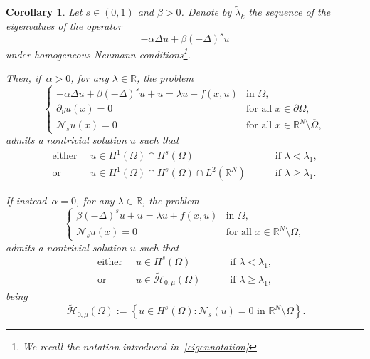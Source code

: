 \documentclass[12pt,a4paper,intlimits,sumlimits]{amsart}
\def \R {\mathbb{R}}
\def \Ns {\mathscr{N}_{s}}
\theoremstyle{definition}
\theoremstyle{plain}
\newtheorem{corollary}[definition]{Corollary}
\numberwithin{equation}{section}
\renewcommand{\ge}{\geqslant}
\begin{document}
\begin{corollary}\label{cor1}
Let $s\in (0, 1)$ and $\beta>0$.  Denote by $\widetilde\lambda_k$ the sequence of the eigenvalues of the operator
\[
-\alpha\Delta u + \beta (-\Delta)^s u
\]
under homogeneous Neumann conditions\footnote{We recall the notation introduced in~\eqref{eigennotation}}.

Then, if~$\alpha>0$, for any $\lambda\in\R$, the problem
\begin{equation}\label{P11}
\begin{cases}
-\alpha\Delta u + \beta (-\Delta)^s u +u=\lambda u +f(x,u)  &\mbox{in }\Omega,\\
\partial_\nu u(x)=0  &\mbox{for all } x\in \partial\Omega,\\
 \Ns u(x)=0 &\mbox{for all }x\in \R^N \setminus \overline{\Omega}, 
\end{cases}
\end{equation}
admits a nontrivial solution $u$ such that 
\begin{equation}\label{spazicor1}
\begin{alignedat}{2}
\mbox{either } \ & u\in H^1(\Omega)\cap H^s (\Omega)  \quad&&\mbox{ if } \lambda<\lambda_1,\\
\mbox{or } \ &u\in H^1(\Omega)\cap H^s (\Omega)\cap L^2(\R^N) \quad&&\mbox{ if } \lambda\ge\lambda_1.
\end{alignedat}
\end{equation}

If instead~$\alpha=0$, for any $\lambda\in\R$, the problem
\begin{equation}\label{P12}
\begin{cases}
\beta(-\Delta)^s u +u=\lambda u +f(x,u)  &\mbox{in }\Omega,\\
 \Ns u(x)=0 &\mbox{for all }x\in \R^N \setminus \overline{\Omega}, 
\end{cases}
\end{equation}
admits a nontrivial solution $u$ such that
\begin{equation}\label{spazicor11}
\begin{alignedat}{2}
\mbox{either } \ & u\in H^s (\Omega)  \quad&&\mbox{ if } \lambda<\lambda_1,\\
\mbox{or } \ &u\in \widetilde{\mathcal H}_{0, \mu} (\Omega) \quad&&\mbox{ if } \lambda\ge\lambda_1,
\end{alignedat}
\end{equation}
being 
\[\
\widetilde{\mathcal H}_{0, \mu}(\Omega):=\left\{u\in H^s(\Omega) : \Ns (u)=0 \mbox{ in }\R^N\setminus \overline{\Omega}\right\}.
\]
\end{corollary}
\end{document}
